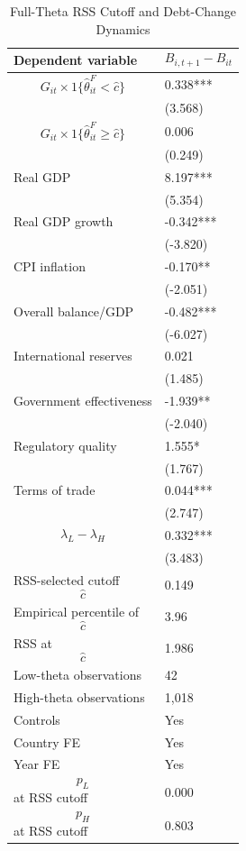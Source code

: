 \begin{table}[H]\centering
\begin{threeparttable}
\caption{Full-Theta RSS Cutoff and Debt-Change Dynamics}
\label{tab:deltaB_rss_cutoff_fulltheta}
\scriptsize
\begin{tabularx}{\textwidth}{lY}
\toprule
Dependent variable & $$B_{i,t+1}-B_{it}$$ \\
\midrule
$$G_{it}\times 1\{\widehat{\theta}^{F}_{it}<\widehat{c}\}$$ & 0.338*** \\
 & (3.568) \\
$$G_{it}\times 1\{\widehat{\theta}^{F}_{it}\geq\widehat{c}\}$$ & 0.006 \\
 & (0.249) \\
Real GDP & 8.197*** \\
 & (5.354) \\
Real GDP growth & -0.342*** \\
 & (-3.820) \\
CPI inflation & -0.170** \\
 & (-2.051) \\
Overall balance/GDP & -0.482*** \\
 & (-6.027) \\
International reserves & 0.021 \\
 & (1.485) \\
Government effectiveness & -1.939** \\
 & (-2.040) \\
Regulatory quality & 1.555* \\
 & (1.767) \\
Terms of trade & 0.044*** \\
 & (2.747) \\
$$\lambda_L-\lambda_H$$ & 0.332*** \\
 & (3.483) \\
\midrule
RSS-selected cutoff $$\widehat{c}$$ & 0.149 \\
Empirical percentile of $$\widehat{c}$$ & 3.96 \\
RSS at $$\widehat{c}$$ & 1.986 \\
Low-theta observations & 42 \\
High-theta observations & 1,018 \\
Controls & Yes \\
Country FE & Yes \\
Year FE & Yes \\
$$p_L$$ at RSS cutoff & 0.000 \\
$$p_H$$ at RSS cutoff & 0.803 \\

\end{tabularx}
\end{threeparttable}
\end{table}

